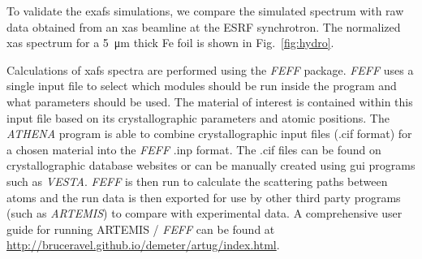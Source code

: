 To validate the \gls{exafs} simulations, we compare the simulated spectrum with raw
data obtained from an \gls{xas} beamline at the ESRF synchrotron. The
normalized \gls{xas} spectrum for a \SI{5}{\micro\metre} thick Fe foil is shown in
Fig.~\ref{fig:hydro}.
%
\begin{figure}
  \label{fig:xafs_spectra}
\end{figure}
%
Calculations of \gls{xafs} spectra are performed using the \textit{FEFF} package. \textit{FEFF} uses a
single input file to select which modules should be run inside the program and
what parameters should be used. The material of interest is contained within
this input file based on its crystallographic parameters and atomic positions.
The \textit{ATHENA} program is able to combine crystallographic input files (.cif format)
for a chosen material into the \textit{FEFF} .inp format. The .cif files can be
found on crystallographic database websites or can be manually created
using gui programs such as \textit{VESTA}. \textit{FEFF} is then run to
calculate the scattering paths
between atoms and the run data is then exported for use by other third party programs
(such as \textit{ARTEMIS}) to compare with experimental data.
A comprehensive user guide for running ARTEMIS
/ \textit{FEFF} can be found at\\
\href{http://bruceravel.github.io/demeter/artug/index.html}{http://bruceravel.github.io/demeter/artug/index.html}.
%
